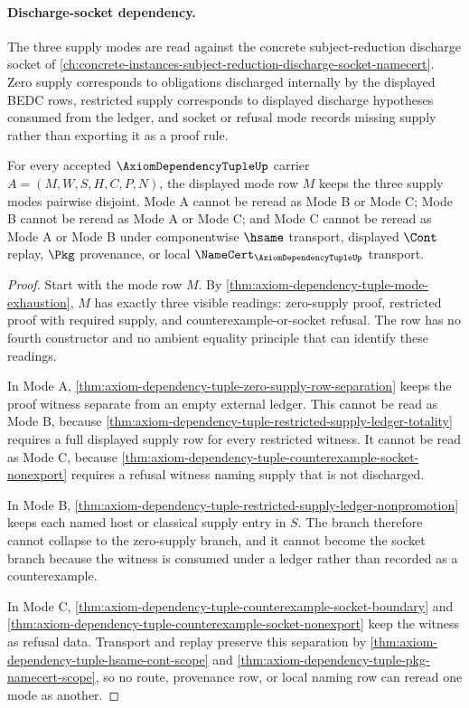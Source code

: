 \paragraph{Discharge-socket dependency.}
The three supply modes are read against the concrete subject-reduction discharge socket of \autoref{ch:concrete-instances-subject-reduction-discharge-socket-namecert}. Zero supply corresponds to obligations discharged internally by the displayed BEDC rows, restricted supply corresponds to displayed discharge hypotheses consumed from the ledger, and socket or refusal mode records missing supply rather than exporting it as a proof rule.

\begin{theorem}
\label{thm:axiom-dependency-tuple-supply-mode-disjointness}
For every accepted $\AxiomDependencyTupleUp$ carrier
$A=(M,W,S,H,C,P,N)$, the displayed mode row $M$ keeps the three supply modes
pairwise disjoint. Mode A cannot be reread as Mode B or Mode C; Mode B cannot be
reread as Mode A or Mode C; and Mode C cannot be reread as Mode A or Mode B
under componentwise $\hsame$ transport, displayed $\Cont$ replay, $\Pkg$
provenance, or local $\NameCert_{\AxiomDependencyTupleUp}$ transport.
\end{theorem}
\begin{proof}
Start with the mode row $M$. By
\autoref{thm:axiom-dependency-tuple-mode-exhaustion}, $M$ has exactly three
visible readings: zero-supply proof, restricted proof with required supply, and
counterexample-or-socket refusal. The row has no fourth constructor and no
ambient equality principle that can identify these readings.

In Mode A, \autoref{thm:axiom-dependency-tuple-zero-supply-row-separation}
keeps the proof witness separate from an empty external ledger. This cannot be
read as Mode B, because
\autoref{thm:axiom-dependency-tuple-restricted-supply-ledger-totality} requires a
full displayed supply row for every restricted witness. It cannot be read as
Mode C, because \autoref{thm:axiom-dependency-tuple-counterexample-socket-nonexport}
requires a refusal witness naming supply that is not discharged.

In Mode B, \autoref{thm:axiom-dependency-tuple-restricted-supply-ledger-nonpromotion}
keeps each named host or classical supply entry in $S$. The branch therefore
cannot collapse to the zero-supply branch, and it cannot become the socket
branch because the witness is consumed under a ledger rather than recorded as a
counterexample.

In Mode C, \autoref{thm:axiom-dependency-tuple-counterexample-socket-boundary}
and \autoref{thm:axiom-dependency-tuple-counterexample-socket-nonexport} keep
the witness as refusal data. Transport and replay preserve this separation by
\autoref{thm:axiom-dependency-tuple-hsame-cont-scope} and
\autoref{thm:axiom-dependency-tuple-pkg-namecert-scope}, so no route,
provenance row, or local naming row can reread one mode as another.
\end{proof}

